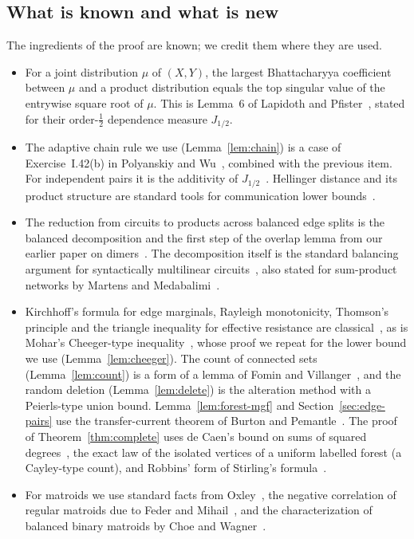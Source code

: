 \subsection{What is known and what is new}\label{sec:intro-priority}

The ingredients of the proof are known; we credit them where they are used.
\begin{itemize}
\item For a joint distribution $\mu$ of $(X,Y)$, the largest Bhattacharyya coefficient between $\mu$ and a product distribution equals the top singular value of the entrywise square root of $\mu$. This is Lemma~6 of Lapidoth and Pfister~\cite{LapidothPfister19}, stated for their order-$\frac12$ dependence measure $J_{1/2}$.
\item The adaptive chain rule we use (Lemma~\ref{lem:chain}) is a case of Exercise~I.42(b) in Polyanskiy and Wu~\cite{PolyanskiyWu25}, combined with the previous item. For independent pairs it is the additivity of $J_{1/2}$~\cite[Lemma~12]{LapidothPfister19}. Hellinger distance and its product structure are standard tools for communication lower bounds~\cite{BJKS04,Jayram09}.
\item The reduction from circuits to products across balanced edge splits is the balanced decomposition and the first step of the overlap lemma from our earlier paper on dimers~\cite[Lemmas~7.1 and~7.2]{Blaschke26Dimers}. The decomposition itself is the standard balancing argument for syntactically multilinear circuits~\cite{RazYehudayoff08}, also stated for sum-product networks by Martens and Medabalimi~\cite[Thm.~38]{MartensMedabalimi14}.
\item Kirchhoff's formula for edge marginals, Rayleigh monotonicity, Thomson's principle and the triangle inequality for effective resistance are classical~\cite{Kirchhoff1847,LyonsPeres16,KleinRandic93}, as is Mohar's Cheeger-type inequality~\cite{Mohar89}, whose proof we repeat for the lower bound we use (Lemma~\ref{lem:cheeger}). The count of connected sets (Lemma~\ref{lem:count}) is a form of a lemma of Fomin and Villanger~\cite{FominVillanger12}, and the random deletion (Lemma~\ref{lem:delete}) is the alteration method with a Peierls-type union bound. Lemma~\ref{lem:forest-mgf} and Section~\ref{sec:edge-pairs} use the transfer-current theorem of Burton and Pemantle~\cite{BurtonPemantle93}. The proof of Theorem~\ref{thm:complete} uses de Caen's bound on sums of squared degrees~\cite{deCaen98}, the exact law of the isolated vertices of a uniform labelled forest (a Cayley-type count), and Robbins' form of Stirling's formula~\cite{Robbins55}.
\item For matroids we use standard facts from Oxley~\cite{Oxley11}, the negative correlation of regular matroids due to Feder and Mihail~\cite{FederMihail92}, and the characterization of balanced binary matroids by Choe and Wagner~\cite{ChoeWagner03}.
\end{itemize}

